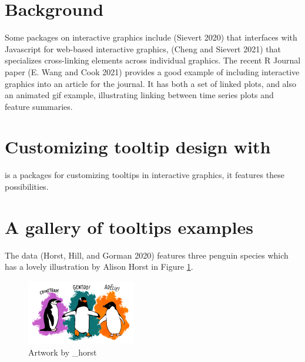 \hypertarget{background}{%
\section{Background}\label{background}}

Some packages on interactive graphics include  (Sievert 2020) that interfaces with Javascript for web-based interactive graphics,  (Cheng and Sievert 2021) that specializes cross-linking elements across individual graphics. The recent R Journal paper  (E. Wang and Cook 2021) provides a good example of including interactive graphics into an article for the journal. It has both a set of linked plots, and also an animated gif example, illustrating linking between time series plots and feature summaries.

\hypertarget{customizing-tooltip-design-with}{%
\section{\texorpdfstring{Customizing tooltip design with }{Customizing tooltip design with }}\label{customizing-tooltip-design-with}}

 is a packages for customizing tooltips in interactive graphics, it features these possibilities.

\hypertarget{a-gallery-of-tooltips-examples}{%
\section{A gallery of tooltips examples}\label{a-gallery-of-tooltips-examples}}

The  data (Horst, Hill, and Gorman 2020) features three penguin species which has a lovely illustration by Alison Horst in Figure \ref{fig:penguins-alison}.

\begin{figure}
\includegraphics[width=1\linewidth,height=0.3\textheight]{penguins} \caption{Artwork by \@allison\_horst}\label{fig:penguins-alison}
\end{figure}

